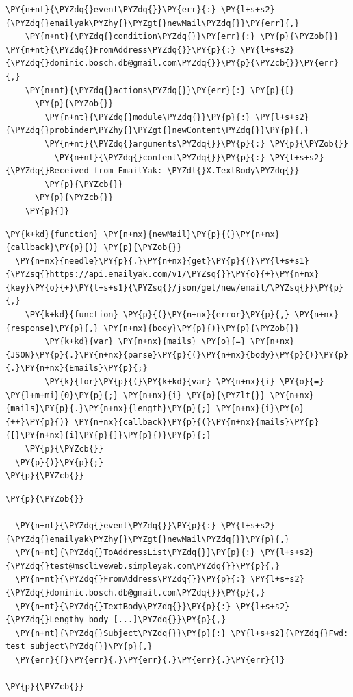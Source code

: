 \newpage


\begin{Verbatim}[commandchars=\\\{\}]
    \PY{n+nt}{\PYZdq{}event\PYZdq{}}\PY{err}{:} \PY{l+s+s2}{\PYZdq{}emailyak\PYZhy{}\PYZgt{}newMail\PYZdq{}}\PY{err}{,}
    \PY{n+nt}{\PYZdq{}condition\PYZdq{}}\PY{err}{:} \PY{p}{\PYZob{}} \PY{n+nt}{\PYZdq{}FromAddress\PYZdq{}}\PY{p}{:} \PY{l+s+s2}{\PYZdq{}dominic.bosch.db@gmail.com\PYZdq{}}\PY{p}{\PYZcb{}}\PY{err}{,}
    \PY{n+nt}{\PYZdq{}actions\PYZdq{}}\PY{err}{:} \PY{p}{[}
      \PY{p}{\PYZob{}}
        \PY{n+nt}{\PYZdq{}module\PYZdq{}}\PY{p}{:} \PY{l+s+s2}{\PYZdq{}probinder\PYZhy{}\PYZgt{}newContent\PYZdq{}}\PY{p}{,}
        \PY{n+nt}{\PYZdq{}arguments\PYZdq{}}\PY{p}{:} \PY{p}{\PYZob{}}
          \PY{n+nt}{\PYZdq{}content\PYZdq{}}\PY{p}{:} \PY{l+s+s2}{\PYZdq{}Received from EmailYak: \PYZdl{}X.TextBody\PYZdq{}}
        \PY{p}{\PYZcb{}}
      \PY{p}{\PYZcb{}}
    \PY{p}{]}
\end{Verbatim}

\begin{Verbatim}[commandchars=\\\{\}]
\PY{k+kd}{function} \PY{n+nx}{newMail}\PY{p}{(}\PY{n+nx}{callback}\PY{p}{)} \PY{p}{\PYZob{}}
  \PY{n+nx}{needle}\PY{p}{.}\PY{n+nx}{get}\PY{p}{(}\PY{l+s+s1}{\PYZsq{}https://api.emailyak.com/v1/\PYZsq{}}\PY{o}{+}\PY{n+nx}{key}\PY{o}{+}\PY{l+s+s1}{\PYZsq{}/json/get/new/email/\PYZsq{}}\PY{p}{,}
    \PY{k+kd}{function} \PY{p}{(}\PY{n+nx}{error}\PY{p}{,} \PY{n+nx}{response}\PY{p}{,} \PY{n+nx}{body}\PY{p}{)}\PY{p}{\PYZob{}}
        \PY{k+kd}{var} \PY{n+nx}{mails} \PY{o}{=} \PY{n+nx}{JSON}\PY{p}{.}\PY{n+nx}{parse}\PY{p}{(}\PY{n+nx}{body}\PY{p}{)}\PY{p}{.}\PY{n+nx}{Emails}\PY{p}{;}
        \PY{k}{for}\PY{p}{(}\PY{k+kd}{var} \PY{n+nx}{i} \PY{o}{=} \PY{l+m+mi}{0}\PY{p}{;} \PY{n+nx}{i} \PY{o}{\PYZlt{}} \PY{n+nx}{mails}\PY{p}{.}\PY{n+nx}{length}\PY{p}{;} \PY{n+nx}{i}\PY{o}{++}\PY{p}{)} \PY{n+nx}{callback}\PY{p}{(}\PY{n+nx}{mails}\PY{p}{[}\PY{n+nx}{i}\PY{p}{]}\PY{p}{)}\PY{p}{;}
    \PY{p}{\PYZcb{}}
  \PY{p}{)}\PY{p}{;}
\PY{p}{\PYZcb{}}
\end{Verbatim}

\begin{Verbatim}[commandchars=\\\{\}]
\PY{p}{\PYZob{}}
  
  \PY{n+nt}{\PYZdq{}event\PYZdq{}}\PY{p}{:} \PY{l+s+s2}{\PYZdq{}emailyak\PYZhy{}\PYZgt{}newMail\PYZdq{}}\PY{p}{,}
  \PY{n+nt}{\PYZdq{}ToAddressList\PYZdq{}}\PY{p}{:} \PY{l+s+s2}{\PYZdq{}test@mscliveweb.simpleyak.com\PYZdq{}}\PY{p}{,}
  \PY{n+nt}{\PYZdq{}FromAddress\PYZdq{}}\PY{p}{:} \PY{l+s+s2}{\PYZdq{}dominic.bosch.db@gmail.com\PYZdq{}}\PY{p}{,}
  \PY{n+nt}{\PYZdq{}TextBody\PYZdq{}}\PY{p}{:} \PY{l+s+s2}{\PYZdq{}Lengthy body [...]\PYZdq{}}\PY{p}{,}
  \PY{n+nt}{\PYZdq{}Subject\PYZdq{}}\PY{p}{:} \PY{l+s+s2}{\PYZdq{}Fwd: test subject\PYZdq{}}\PY{p}{,}
  \PY{err}{[}\PY{err}{.}\PY{err}{.}\PY{err}{.}\PY{err}{]}

\PY{p}{\PYZcb{}}
\end{Verbatim}
